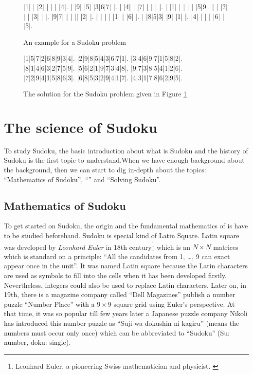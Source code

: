 \documentclass[11pt]{report}
\begin{document}
\begin{figure}[htbp]
\begin{sudoku}
 |1| | |2| | | | |4|.
 | |9| |5| |3|6|7| |.
 | |4| | |7| | | | |.
 | |1| | | | | |5|9|.
 | | |2| | | |3| | |.
 |9|7| | | || |2| |.
 | | | | |1| | |6| |.
 | |8|5|3| |9| |1| |.
 |4| | | | |6| | |5|.
\end{sudoku}
\caption{An example for a Sudoku problem}
\label{sudokuEx}
\end{figure}

\begin{figure}[htbp]
\begin{sudoku}
  |1|5|7|2|6|8|9|3|4|.
  |2|9|8|5|4|3|6|7|1|.
  |3|4|6|9|7|1|5|8|2|.
  |8|1|4|6|3|2|7|5|9|.
  |5|6|2|1|9|7|3|4|8|.
  |9|7|3|8|5|4|1|2|6|.
  |7|2|9|4|1|5|8|6|3|.
  |6|8|5|3|2|9|4|1|7|.
  |4|3|1|7|8|6|2|9|5|.
\end{sudoku}
\caption{The solution for the Sudoku problem given in Figure \ref{sudokuEx}}
\label{fig:solutionsudokuEx}
\end{figure}





\section{The science of Sudoku}
\label{sec:introLiterature}
 
To study Sudoku, the basic introduction about what is Sudoku and the history of Sudoku is the first topic to understand.When we have enough background about the background, then we can start to dig in-depth about the topics: ``Mathematics of Sudoku'', ``'' and ``Solving Sudoku''.

\subsection{Mathematics of Sudoku}
\label{sec:background}
To get started on Sudoku, the origin and the fundamental mathematics of is have to be studied beforehand. Sudoku is special kind of Latin Square\cite{website:LatinSquare}. Latin square was developed by \textit{Leonhard Euler} in 18th century\footnote{Leonhard Euler, a pioneering Swiss mathematician and physicist. \cite{website:LeonhardEuler}} which is an $N \times N$ matrices which is standard on a principle: ``All the candidates from 1, \dots , 9 can exact appear once in the unit''. It was named Latin square because the Latin characters are used as symbols to fill into the cells\cite{Delahay2006Science} when it has been developed firstly. Nevertheless, integers could also be used to replace Latin characters. Later on, in 19th, there is a magazine company called ``Dell Magazines'' publish a number puzzle ``Number Place'' with a $9 \times 9$ square grid using Euler's perspective. At that time, it was so popular till few years later a Japanese puzzle company Nikoli has introduced this number puzzle as ``Suji wa dokushin ni kagiru'' (means the numbers must occur only once) which can be abbreviated to ``Sudoku'' (Su: number, doku: single)\cite{GarciaPalomino2007SolvingSudoku}. 
\end{document}
